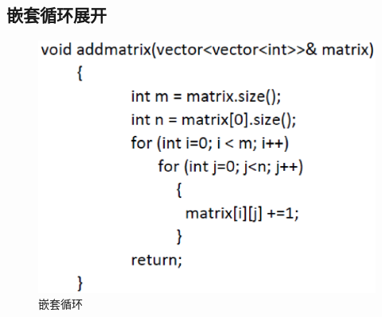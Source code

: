 \subsection{嵌套循环展开}
\begin{figure}[!h]
\centering
\includegraphics[width=0.8\linewidth]{figure4.eps}
\caption{嵌套循环}\label{figure4}
\end{figure}

